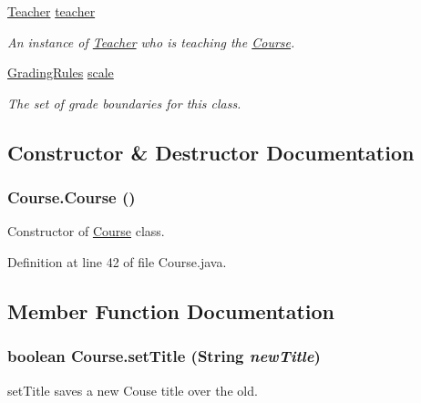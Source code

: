 \begin{CompactItemize}
\hyperlink{classTeacher}{Teacher} \hyperlink{classCourse_2e9ff59d7be67142a26b00e07695a1da}{teacher}
\begin{CompactList}\small\item\em An instance of \hyperlink{classTeacher}{Teacher} who is teaching the \hyperlink{classCourse}{Course}. \item\end{CompactList}\item 
\hyperlink{classGradingRules}{GradingRules} \hyperlink{classCourse_92119e5fc9ef69e7b3c26ba3d36a3c4e}{scale}
\begin{CompactList}\small\item\em The set of grade boundaries for this class. \item\end{CompactList}\end{CompactItemize}


\subsection{Constructor \& Destructor Documentation}
\hypertarget{classCourse_85d22954deffe5dd6c35c94304ac7092}{
\subsubsection{\setlength{\rightskip}{0pt plus 5cm}Course.Course ()}}
\label{classCourse_85d22954deffe5dd6c35c94304ac7092}


Constructor of \hyperlink{classCourse}{Course} class. 



Definition at line 42 of file Course.java.

\subsection{Member Function Documentation}
\hypertarget{classCourse_fab2ecaf6ad860890161c693b7a3aa00}{
\subsubsection{\setlength{\rightskip}{0pt plus 5cm}boolean Course.setTitle (String {\em newTitle})}}
\label{classCourse_fab2ecaf6ad860890161c693b7a3aa00}


setTitle saves a new Couse title over the old. 

